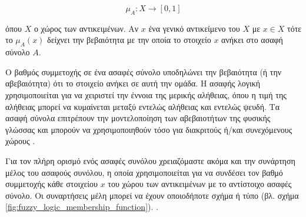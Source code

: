 \documentclass{assignment}
\begin{document}
\begin{equation}
\mu_A : X \rightarrow [0,1]
\label{eq:fuzzy_set}
\end{equation}

όπου $X$ ο χώρος των αντικειμένων. Αν $x$ ένα γενικό αντικείμενο του $X$ με $x \in X$ τότε το $\mu_A(x)$ δείχνει την βεβαιότητα με την οποία το στοιχείο $x$ ανήκει στο ασαφή σύνολο $A$.

Ο βαθμός συμμετοχής σε ένα ασαφές σύνολο υποδηλώνει την βεβαιότητα (ή την αβεβαιότητα) ότι το στοιχείο ανήκει σε αυτή την ομάδα. Η ασαφής λογική χρησιμοποιείται για να χειριστεί την έννοια της μερικής αλήθειας, όπου η τιμή της αλήθειας μπορεί να κυμαίνεται μεταξύ εντελώς αλήθειας και εντελώς ψευδή. Τα ασαφή σύνολα επιτρέπουν την μοντελοποίηση των αβεβαιοτήτων της φυσικής γλώσσας και μπορούν να χρησιμοποιηθούν τόσο για διακριτούς ή/και συνεχόμενους χώρους \cite{engelbrecht,class_notes,wiki:fuzzy_logic}. 

Για τον πλήρη ορισμό ενός ασαφές συνόλου χρειαζόμαστε ακόμα και την συνάρτηση μέλος του ασαφούς συνόλου, η οποία χρησιμοποιείται για να συνδέσει τον βαθμό συμμετοχής κάθε στοιχείου $x$ του χώρου των αντικειμένων με το αντίστοιχο ασαφές σύνολο. Οι συναρτήσεις μέλη μπορεί να έχουν οποιοδήποτε σχήμα ή τύπο (βλ. σχήμα \ref{fig:fuzzy_logic_membership_function}). \cite{engelbrecht}.
\end{document}
